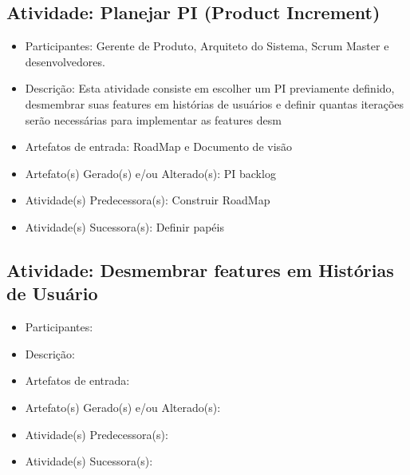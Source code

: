 \subsection{Atividade: Planejar PI (Product Increment)}
\begin{itemize}
\item Participantes: Gerente de Produto, Arquiteto do Sistema, Scrum Master e desenvolvedores.

\item Descrição: Esta atividade consiste em escolher um PI previamente definido, desmembrar suas features em histórias de usuários e definir quantas iterações serão necessárias para implementar as features desm

\item Artefatos de entrada: RoadMap e Documento de visão

\item Artefato(s) Gerado(s) e/ou Alterado(s): PI backlog

\item Atividade(s) Predecessora(s): Construir RoadMap
  
\item Atividade(s) Sucessora(s): Definir papéis
\end{itemize}


\subsection{Atividade: Desmembrar features em Histórias de Usuário}
\begin{itemize}
\item Participantes: 

\item Descrição: 

\item Artefatos de entrada: 

\item Artefato(s) Gerado(s) e/ou Alterado(s): 

\item Atividade(s) Predecessora(s): 
  
\item Atividade(s) Sucessora(s): 
\end{itemize}

